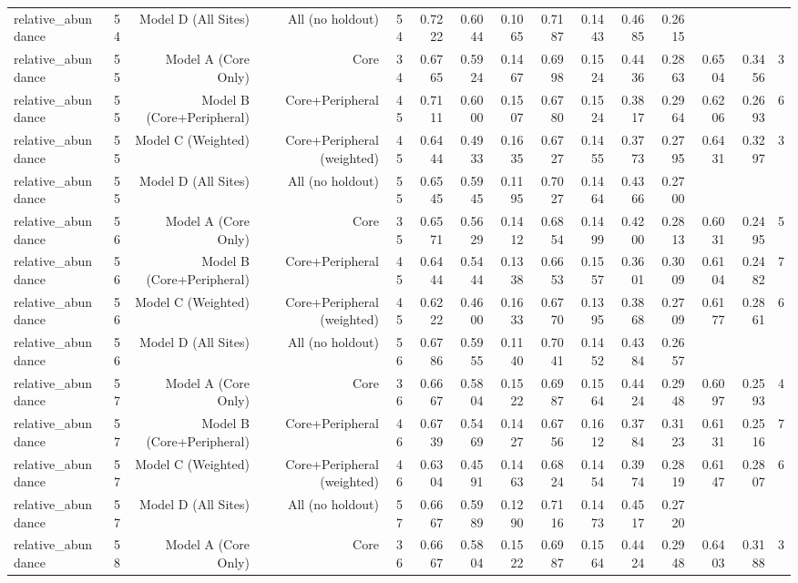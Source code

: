 {\begin{longtable}{lrrrrrrrrrrrrrr}
  relative\_abundance & 54 & Model D (All Sites) & All (no holdout) & 54 & 0.7222 & 0.6044 & 0.1065 & 0.7187 & 0.1443 & 0.4685 & 0.2615 &  &  &  \\
  relative\_abundance & 55 & Model A (Core Only) & Core & 34 & 0.6765 & 0.5924 & 0.1467 & 0.6998 & 0.1524 & 0.4436 & 0.2863 & 0.6504 & 0.3456 & 3 \\
  relative\_abundance & 55 & Model B (Core+Peripheral) & Core+Peripheral & 45 & 0.7111 & 0.6000 & 0.1507 & 0.6780 & 0.1524 & 0.3817 & 0.2964 & 0.6206 & 0.2693 & 6 \\
  relative\_abundance & 55 & Model C (Weighted) & Core+Peripheral (weighted) & 45 & 0.6444 & 0.4933 & 0.1635 & 0.6727 & 0.1455 & 0.3773 & 0.2795 & 0.6431 & 0.3297 & 3 \\
  relative\_abundance & 55 & Model D (All Sites) & All (no holdout) & 55 & 0.6545 & 0.5945 & 0.1195 & 0.7027 & 0.1464 & 0.4366 & 0.2700 &  &  &  \\
  relative\_abundance & 56 & Model A (Core Only) & Core & 35 & 0.6571 & 0.5629 & 0.1412 & 0.6854 & 0.1499 & 0.4200 & 0.2813 & 0.6031 & 0.2495 & 5 \\
  relative\_abundance & 56 & Model B (Core+Peripheral) & Core+Peripheral & 45 & 0.6444 & 0.5444 & 0.1338 & 0.6653 & 0.1557 & 0.3601 & 0.3009 & 0.6104 & 0.2482 & 7 \\
  relative\_abundance & 56 & Model C (Weighted) & Core+Peripheral (weighted) & 45 & 0.6222 & 0.4600 & 0.1633 & 0.6770 & 0.1395 & 0.3868 & 0.2709 & 0.6177 & 0.2861 & 6 \\
  relative\_abundance & 56 & Model D (All Sites) & All (no holdout) & 56 & 0.6786 & 0.5955 & 0.1140 & 0.7041 & 0.1452 & 0.4384 & 0.2657 &  &  &  \\
  relative\_abundance & 57 & Model A (Core Only) & Core & 36 & 0.6667 & 0.5804 & 0.1522 & 0.6987 & 0.1564 & 0.4424 & 0.2948 & 0.6097 & 0.2593 & 4 \\
  relative\_abundance & 57 & Model B (Core+Peripheral) & Core+Peripheral & 46 & 0.6739 & 0.5469 & 0.1427 & 0.6756 & 0.1612 & 0.3784 & 0.3123 & 0.6131 & 0.2516 & 7 \\
  relative\_abundance & 57 & Model C (Weighted) & Core+Peripheral (weighted) & 46 & 0.6304 & 0.4591 & 0.1463 & 0.6824 & 0.1454 & 0.3974 & 0.2819 & 0.6147 & 0.2807 & 6 \\
  relative\_abundance & 57 & Model D (All Sites) & All (no holdout) & 57 & 0.6667 & 0.5989 & 0.1290 & 0.7116 & 0.1473 & 0.4517 & 0.2720 &  &  &  \\
  relative\_abundance & 58 & Model A (Core Only) & Core & 36 & 0.6667 & 0.5804 & 0.1522 & 0.6987 & 0.1564 & 0.4424 & 0.2948 & 0.6403 & 0.3188 & 3 \\

\end{longtable}}
